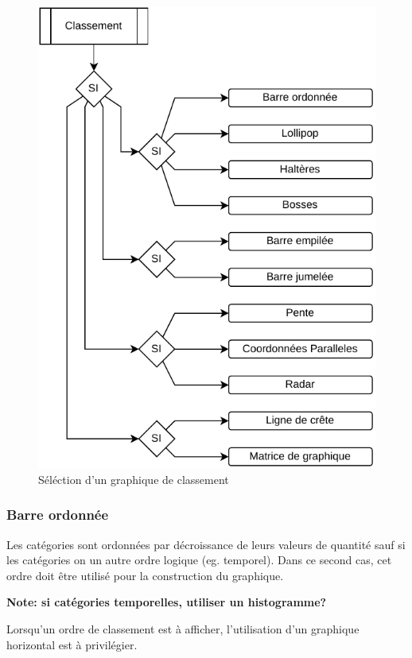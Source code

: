 \documentclass[a4paper,12pt]{article}
\begin{document}
\begin{multicols}{2}
\begin{figure}[H]
\centering
\includegraphics[width=.9\linewidth]{./img/select-classement.pdf}
\caption{\label{fig:orgd477e3c}Séléction d'un graphique de classement}
\end{figure}
\subsubsection*{Barre ordonnée}
\label{sec:orgb910d9f}
Les catégories sont ordonnées par décroissance de leurs valeurs de quantité\autocite{jonathanschwabishComparingCategories2021} sauf si les catégories on un autre ordre logique (eg. temporel). Dans ce second cas, cet ordre doit être utilisé pour la construction du graphique. \autocite{wilkeVisualizingAmounts2019}

\textbf{Note: si catégories temporelles, utiliser un histogramme?}

Lorsqu'un ordre de classement est à afficher, l'utilisation d'un graphique horizontal est à privilégier. \autocite{andreaskrauseBestPracticesData2024}


\end{multicols}
\end{document}
